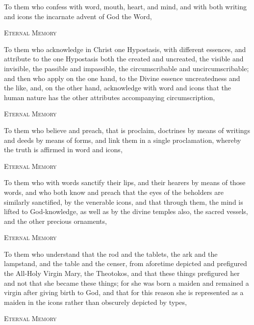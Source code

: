 To them who confess  with word, mouth, heart, and mind, and with both writing and icons the incarnate advent of God the Word,

\begin{center}
\textsc{Eternal Memory} 
\end{center}

To them who acknowledge in Christ one Hypostasis, with different essences, and attribute to the one Hypostasis both the created and uncreated, the visible and invisible, the passible and impassible, the circumscribable and uncircumscribable; and then who apply on the one hand, to the Divine essence uncreatedness and the like, and, on the other hand, acknowledge with word and icons that the human nature has the other attributes accompanying circumscription,

\begin{center}
\textsc{Eternal Memory} 
\end{center}

To them who believe and preach, that is proclaim, doctrines by means of writings and deeds by means of forms, and link them in a single proclamation, whereby the truth is affirmed in word and icons,

\begin{center}
\textsc{Eternal Memory} 
\end{center}

To them who with words sanctify their lips, and their hearers by means of those words, and who both know and preach that the eyes of the beholders are similarly sanctified, by the venerable icons, and that through them, the mind is lifted to God-knowledge, as well as by the divine temples also, the sacred vessels, and the other precious ornaments,

\begin{center}
\textsc{Eternal Memory} 
\end{center}

To them who understand that the rod and the tablets, the ark and the lampstand, and the table and the censer, from aforetime depicted and prefigured the All-Holy Virgin Mary, the Theotokos, and that these things prefigured her and not that she became these things; for she was born a maiden and remained a virgin after giving birth to God, and that for this reason she is represented as a maiden in the icons rather than obscurely depicted by types,

\begin{center}
\textsc{Eternal Memory} 
\end{center}

